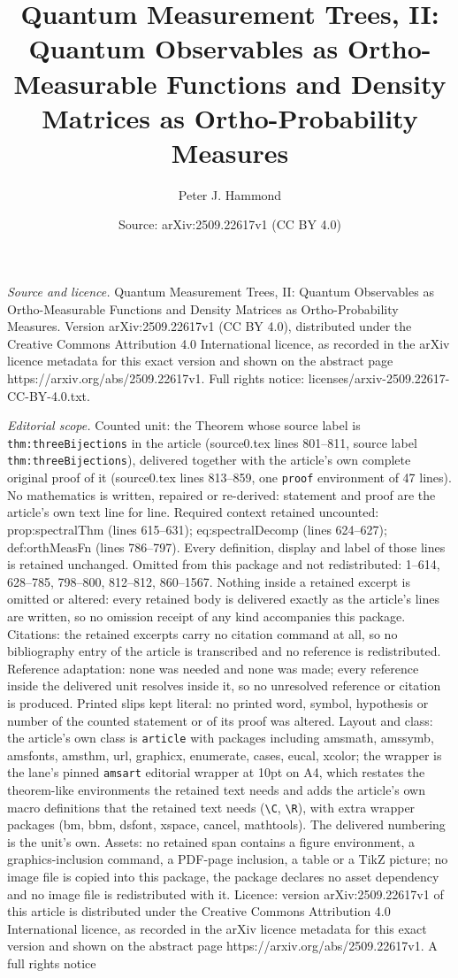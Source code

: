 \documentclass[10pt,a4paper]{amsart}
\title[Quantum Measurement Trees, II: Quantum Observables as Ortho-]{Quantum Measurement Trees, II: Quantum Observables as Ortho-Measurable Functions and Density Matrices as Ortho-Probability Measures}
\author{Peter J. Hammond}
\date{Source: arXiv:2509.22617v1 (CC BY 4.0)}
\begin{document}
\maketitle

\noindent\emph{Source and licence.} Quantum Measurement Trees, II: Quantum Observables as Ortho-Measurable Functions and Density Matrices as Ortho-Probability Measures. Version arXiv:2509.22617v1 (CC BY 4.0), distributed under the Creative Commons Attribution 4.0 International licence, as recorded in the arXiv licence metadata for this exact version and shown on the abstract page https://arxiv.org/abs/2509.22617v1. Full rights notice: licenses/arxiv-2509.22617-CC-BY-4.0.txt.\par\smallskip

\noindent\textit{Editorial scope.} Counted unit: the Theorem whose source label is \texttt{thm:threeBijections} in the article (source0.tex lines 801--811, source label \texttt{thm:threeBijections}), delivered together with the article's own complete original proof of it (source0.tex lines 813--859, one \texttt{proof} environment of 47 lines). No mathematics is written, repaired or re-derived: statement and proof are the article's own text line for line. Required context retained uncounted: prop:spectralThm (lines 615--631); eq:spectralDecomp (lines 624--627); def:orthMeasFn (lines 786--797). Every definition, display and label of those lines is retained unchanged. Omitted from this package and not redistributed: 1--614, 628--785, 798--800, 812--812, 860--1567. Nothing inside a retained excerpt is omitted or altered: every retained body is delivered exactly as the article's lines are written, so no omission receipt of any kind accompanies this package. Citations: the retained excerpts carry no citation command at all, so no bibliography entry of the article is transcribed and no reference is redistributed. Reference adaptation: none was needed and none was made; every reference inside the delivered unit resolves inside it, so no unresolved reference or citation is produced. Printed slips kept literal: no printed word, symbol, hypothesis or number of the counted statement or of its proof was altered. Layout and class: the article's own class is \texttt{article} with packages including amsmath, amssymb, amsfonts, amsthm, url, graphicx, enumerate, cases, eucal, xcolor; the wrapper is the lane's pinned \texttt{amsart} editorial wrapper at 10pt on A4, which restates the theorem-like environments the retained text needs and adds the article's own macro definitions that the retained text needs (\texttt{\textbackslash C}, \texttt{\textbackslash R}), with extra wrapper packages (bm, bbm, dsfont, xspace, cancel, mathtools). The delivered numbering is the unit's own. Assets: no retained span contains a figure environment, a graphics-inclusion command, a PDF-page inclusion, a table or a TikZ picture; no image file is copied into this package, the package declares no asset dependency and no image file is redistributed with it. Licence: version arXiv:2509.22617v1 of this article is distributed under the Creative Commons Attribution 4.0 International licence, as recorded in the arXiv licence metadata for this exact version and shown on the abstract page https://arxiv.org/abs/2509.22617v1. A full rights notice 
\end{document}
